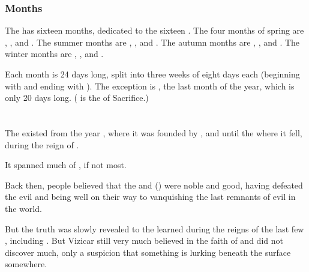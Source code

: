 \subsubsection{Months}

The \ImperialCalendar{} has sixteen months, dedicated to the sixteen \sephiroth{}.
The four months of spring are \Atzirah{}, \Razilah, \Keshirah{} and \Feazirah{}. 
The summer months are \Barion{}, \Teshiron, \Izion{} and \Hapheron. 
The autumn months are \Thimared, \Yemared, \Cushed{} and \Hoshied. 
The winter months are \Omariel, \Yeziel, \Ishiel{} and \Gamishiel. 

Each month is 24 days long, split into three weeks of eight days each (beginning with \Corjin{} and ending with \Siljin). 
The exception is \Gamishiel{}, the last month of the year, which is only 20 days long. 
(\Gamishiel{} is the \sephirah{} of Sacrifice.) 
















\section{\VaimonCaliphate}
The \VaimonCaliphate existed from the year , where it was founded by , and until the  where it fell, during the reign of . 

It spanned much of \Azmith, if not most. 

Back then, people believed that the \Sephiroth{} and  (\resphain) were noble and good, having defeated the evil \pdaemons{} and being well on their way to vanquishing the last remnants of evil in the world. 

But the truth was slowly revealed to the learned during the reigns of the last few \caliphs, including . But Vizicar still very much believed in the faith of \iquin{} and did not discover much, only a suspicion that something is lurking beneath the surface somewhere.

